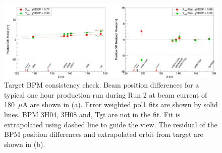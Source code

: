 \begin{singlespace}
\begin{figure}[!h]
	\begin{center}
	\includegraphics[width=15.0cm]{figures/targetBPMConsistencyCheck}
	\end{center}
	\caption
	{Target BPM consistency check. Beam position differences for a typical one hour production run during Run 2 at beam current of 180~$\mu$A are shown in (a). Error weighted pol1 fits are shown by solid lines. BPM 3H04, 3H08 and, Tgt are not in the fit. Fit is extrapolated using dashed line to guide the view. The residual of the BPM position differences and extrapolated orbit from target are shown in (b).}
	\label{fig:targetBPMConsistencyCheck}
\end{figure}
\end{singlespace}

